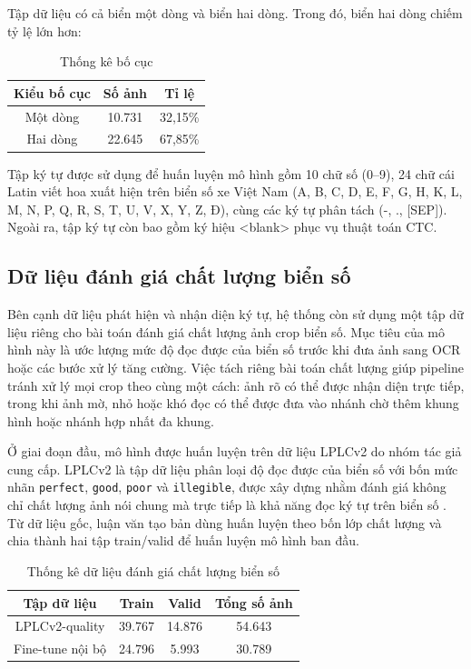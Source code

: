 \documentclass[../DoAn.tex]{subfiles}
\begin{document}
Tập dữ liệu có cả biển một dòng và biển hai dòng. Trong đó, biển hai dòng chiếm tỷ lệ lớn hơn:
\begin{table}[htbp]
\centering
\caption{Thống kê bố cục}
\begin{tabular}{|c|c|c|}
\hline
Kiểu bố cục & Số ảnh & Tỉ lệ \\
\hline
Một dòng & 10.731 & 32,15\% \\
Hai dòng & 22.645 & 67,85\% \\
\hline
\end{tabular}
\end{table}

Tập ký tự được sử dụng để huấn luyện mô hình gồm 10 chữ số (0–9), 24 chữ cái Latin viết hoa xuất hiện trên biển số xe Việt Nam (A, B, C, D, E, F, G, H, K, L, M, N, P, Q, R, S, T, U, V, X, Y, Z, Đ), cùng các ký tự phân tách (-, ., [SEP]). Ngoài ra, tập ký tự còn bao gồm ký hiệu <blank> phục vụ thuật toán CTC.
\subsection{Dữ liệu đánh giá chất lượng biển số}
\label{subsection:4.data.3}

Bên cạnh dữ liệu phát hiện và nhận diện ký tự, hệ thống còn sử dụng một tập dữ liệu riêng cho bài toán đánh giá chất lượng ảnh crop biển số. Mục tiêu của mô hình này là ước lượng mức độ đọc được của biển số trước khi đưa ảnh sang OCR hoặc các bước xử lý tăng cường. Việc tách riêng bài toán chất lượng giúp pipeline tránh xử lý mọi crop theo cùng một cách: ảnh rõ có thể được nhận diện trực tiếp, trong khi ảnh mờ, nhỏ hoặc khó đọc có thể được đưa vào nhánh chờ thêm khung hình hoặc nhánh hợp nhất đa khung.

Ở giai đoạn đầu, mô hình được huấn luyện trên dữ liệu LPLCv2 do nhóm tác giả cung cấp. LPLCv2 là tập dữ liệu phân loại độ đọc được của biển số với bốn mức nhãn  \texttt{perfect},  \texttt{good},  \texttt{poor} và  \texttt{illegible}, được xây dựng nhằm đánh giá không chỉ chất lượng ảnh nói chung mà trực tiếp là khả năng đọc ký tự trên biển số \cite{wojcik2026lplcv2}. Từ dữ liệu gốc, luận văn tạo bản dùng huấn luyện theo bốn lớp chất lượng và chia thành hai tập train/valid để huấn luyện mô hình ban đầu.

\begin{table}[htbp]
\centering
\caption{Thống kê dữ liệu đánh giá chất lượng biển số}
\begin{tabular}{|c|c|c|c|}
\hline
Tập dữ liệu & Train & Valid & Tổng số ảnh \\
\hline
LPLCv2-quality & 39.767 & 14.876 & 54.643 \\
Fine-tune nội bộ & 24.796 & 5.993 & 30.789 \\
\hline
\end{tabular}
\end{table}
\end{document}
